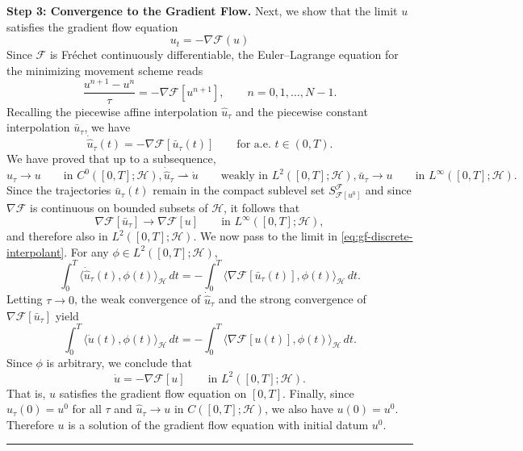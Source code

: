 \documentclass[twoside,11pt]{article}
\newcommand{\BlackBoxProof}{\rule{1.5ex}{1.5ex}}
\renewenvironment{proof}{\par\noindent{\bf Proof\ }}{\hfill\BlackBoxProof\par\medskip}
\begin{document}
\begin{proof}
\noindent \textbf{Step 3: Convergence to the Gradient Flow.} Next, we show that the limit $u$ satisfies the gradient flow equation
\begin{equation}
u_t = - \nabla \mathcal{F}(u)
\end{equation}
Since $\mathcal F$ is Fr\'echet continuously differentiable, the Euler--Lagrange equation for the minimizing movement scheme reads
\[
\frac{u^{n+1}-u^n}{\tau}=-\nabla\mathcal F[u^{n+1}],
\qquad n=0,1,\dots,N-1.
\]
Recalling the piecewise affine interpolation $\hat u_\tau$ and the piecewise constant interpolation $\bar u_\tau$, we have
\begin{equation}\label{eq:gf-discrete-interpolant}
\dot{\hat u}_\tau(t)=-\nabla\mathcal F[\bar u_\tau(t)]
\qquad \text{for a.e. } t\in(0,T).
\end{equation}
We have proved that up to a subsequence,
\[
\hat u_\tau \to u \qquad \text{in } C^0([0,T];\mathcal H), \dot{\hat u}_\tau \rightharpoonup \dot u
\qquad \text{weakly in } L^2([0,T];\mathcal H), \bar u_\tau \to u
\qquad \text{in } L^\infty([0,T];\mathcal H).
\]
Since the trajectories $\bar u_\tau(t)$ remain in the compact sublevel set
\(
S_{\mathcal F[u^0]}^{\mathcal F} \)
and since $\nabla\mathcal F$ is continuous on bounded subsets of $\mathcal H$, it follows that
\[
\nabla\mathcal F[\bar u_\tau]\to \nabla\mathcal F[u]
\qquad \text{in } L^\infty([0,T];\mathcal H),
\]
and therefore also in $L^2([0,T];\mathcal H)$. We now pass to the limit in \eqref{eq:gf-discrete-interpolant}. For any $\phi\in L^2([0,T];\mathcal H)$,
\[
\int_0^T \langle \dot{\hat u}_\tau(t),\phi(t)\rangle_{\mathcal H}\,dt
=
-\int_0^T \langle \nabla\mathcal F[\bar u_\tau(t)],\phi(t)\rangle_{\mathcal H}\,dt.
\]
Letting $\tau\to0$, the weak convergence of $\dot{\hat u}_\tau$ and the strong convergence of $\nabla\mathcal F[\bar u_\tau]$ yield
\[
\int_0^T \langle \dot u(t),\phi(t)\rangle_{\mathcal H}\,dt
=
-\int_0^T \langle \nabla\mathcal F[u(t)],\phi(t)\rangle_{\mathcal H}\,dt.
\]
Since $\phi$ is arbitrary, we conclude that
\[
\dot u=-\nabla\mathcal F[u]
\qquad \text{in } L^2([0,T];\mathcal H).
\]
That is, $u$ satisfies the gradient flow equation on $[0,T]$. Finally, since $\hat u_\tau(0)=u^0$ for all $\tau$ and $\hat u_\tau\to u$ in $C([0,T];\mathcal H)$, we also have
\(
u(0)=u^0.
\)
Therefore $u$ is a solution of the gradient flow equation with initial datum $u^0$.



\end{proof}
\end{document}
